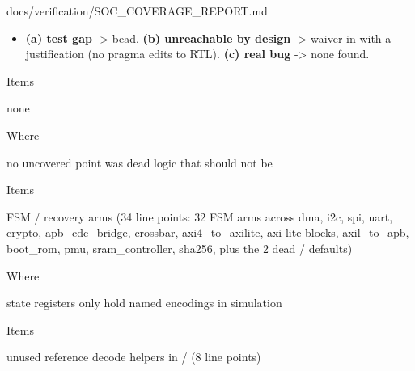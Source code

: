 \begin{relocated}{docs/verification/SOC_COVERAGE_REPORT.md}
\begin{itemize}
\tightlist
\item
  \textbf{(a) test gap} -\textgreater{} bead. \textbf{(b) unreachable by
  design} -\textgreater{} waiver in
   with a justification (no pragma
  edits to RTL). \textbf{(c) real bug} -\textgreater{} none found.
\end{itemize}

\begin{rowtable}



\begin{rowcell}{Items}

none

\end{rowcell}

\begin{rowcell}{Where}

no uncovered point was dead logic that should not be

\end{rowcell}


\begin{rowcell}{Items}

FSM /   recovery arms (34 line points: 32 FSM
arms across dma, i2c, spi, uart, crypto,
apb\_\allowbreak{}cdc\_\allowbreak{}bridge, crossbar,
axi4\_\allowbreak{}to\_\allowbreak{}axilite, axi-lite blocks,
axil\_\allowbreak{}to\_\allowbreak{}apb, boot\_rom, pmu,
sram\_\allowbreak{}controller, sha256, plus the 2 dead  /
 defaults)

\end{rowcell}

\begin{rowcell}{Where}

state registers only hold named encodings in simulation

\end{rowcell}


\begin{rowcell}{Items}

unused reference decode helpers in  /
 (8 line points)

\end{rowcell}


\end{rowtable}
\end{relocated}
